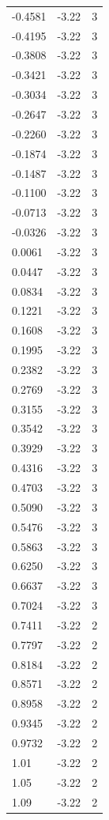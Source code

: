 \begin{longtable}{lrr}
  -0.4581 & -3.22 & 3 \\
  -0.4195 & -3.22 & 3 \\
  -0.3808 & -3.22 & 3 \\
  -0.3421 & -3.22 & 3 \\
  -0.3034 & -3.22 & 3 \\
  -0.2647 & -3.22 & 3 \\
  -0.2260 & -3.22 & 3 \\
  -0.1874 & -3.22 & 3 \\
  -0.1487 & -3.22 & 3 \\
  -0.1100 & -3.22 & 3 \\
  -0.0713 & -3.22 & 3 \\
  -0.0326 & -3.22 & 3 \\
  0.0061 & -3.22 & 3 \\
  0.0447 & -3.22 & 3 \\
  0.0834 & -3.22 & 3 \\
  0.1221 & -3.22 & 3 \\
  0.1608 & -3.22 & 3 \\
  0.1995 & -3.22 & 3 \\
  0.2382 & -3.22 & 3 \\
  0.2769 & -3.22 & 3 \\
  0.3155 & -3.22 & 3 \\
  0.3542 & -3.22 & 3 \\
  0.3929 & -3.22 & 3 \\
  0.4316 & -3.22 & 3 \\
  0.4703 & -3.22 & 3 \\
  0.5090 & -3.22 & 3 \\
  0.5476 & -3.22 & 3 \\
  0.5863 & -3.22 & 3 \\
  0.6250 & -3.22 & 3 \\
  0.6637 & -3.22 & 3 \\
  0.7024 & -3.22 & 3 \\
  0.7411 & -3.22 & 2 \\
  0.7797 & -3.22 & 2 \\
  0.8184 & -3.22 & 2 \\
  0.8571 & -3.22 & 2 \\
  0.8958 & -3.22 & 2 \\
  0.9345 & -3.22 & 2 \\
  0.9732 & -3.22 & 2 \\
  1.01 & -3.22 & 2 \\
  1.05 & -3.22 & 2 \\
  1.09 & -3.22 & 2 \\

\end{longtable}
